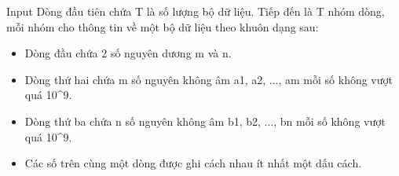 Input
Dòng đầu tiên chứa T là số lượng bộ dữ liệu. Tiếp đến là T nhóm dòng, mỗi nhóm cho thông tin về một bộ dữ liệu theo khuôn dạng sau:
\begin{itemize}
	\item Dòng đầu chứa 2 số nguyên dương m và n.
	\item Dòng thứ hai chứa m số nguyên không âm a1, a2, ..., am mỗi số không vượt quá 10^9.
	\item Dòng thứ ba chứa n số nguyên không âm b1, b2, ..., bn mỗi số không vượt quá 10^9.
	\item Các số trên cùng một dòng được ghi cách nhau ít nhất một dấu cách.
\end{itemize}
